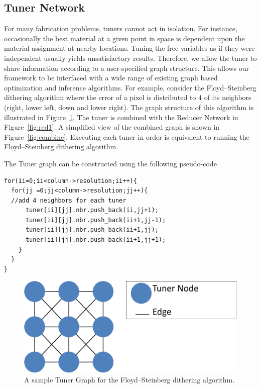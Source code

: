 \documentclass[annual]{acmsiggraph}
\begin{document}
\subsection{Tuner Network}
For many fabrication problems, tuners cannot act in isolation. For instance,  occasionally the best material at a given point in space is dependent upon the material assignment at nearby locations.  Tuning the free variables as if they were independent usually yields unsatisfactory results. Therefore, we allow the tuner to share information according to a user-specified graph structure.  This allows our framework to be interfaced with a wide range of existing graph based optimization and inference algorithms. For example, consider the Floyd–Steinberg dithering algorithm where the error of a pixel is distributed
to $4$ of its neighbors (right, lower left, down and lower right).  The graph structure of this algorithm is illustrated in Figure~\ref{fig:tuner}. The tuner is combined with the Reducer Network in Figure~\ref{fig:red1}. A simplified view of the combined graph is shown in Figure~\ref{fig:combine}. Executing each tuner in order is equivalent to running the Floyd–Steinberg dithering algorithm. 

The Tuner graph can be constructed using the following pseudo-code
\begin{verbatim}
for(ii=0;ii<column->resolution;ii++){
  for(jj =0;jj<column->resolution;jj++){
  //add 4 neighbors for each tuner
      tuner[ii][jj].nbr.push_back(ii,jj+1);
      tuner[ii][jj].nbr.push_back(ii+1,jj-1);
      tuner[ii][jj].nbr.push_back(ii+1,jj);
      tuner[ii][jj].nbr.push_back(ii+1,jj+1);    
    }
  }
}
\end{verbatim}

\begin{figure}[h]
\includegraphics[scale=0.3]{figure/tuner.pdf}
\caption{A sample Tuner Graph for the Floyd–Steinberg dithering algorithm.}
\label{fig:tuner}
\end{figure}
\end{document}
